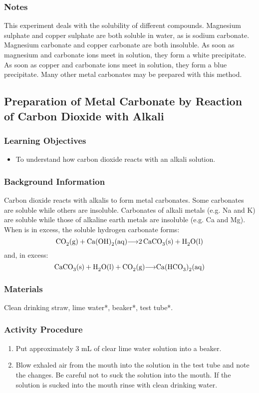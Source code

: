 \subsubsection*{Notes}
This experiment deals with the solubility of different compounds. Magnesium sulphate and copper sulphate are both soluble in water, as is sodium carbonate. Magnesium carbonate and copper carbonate are both insoluble. As soon as magnesium and carbonate ions meet in solution, they form a white precipitate. As soon as copper and carbonate ions meet in solution, they form a blue precipitate. Many other metal carbonates may be prepared with this method.

\subsection{Preparation of Metal Carbonate by Reaction of Carbon Dioxide with Alkali}

\subsubsection*{Learning Objectives}
\begin{itemize}
\item{To understand how carbon dioxide reacts with an alkali solution.}
\end{itemize}

\subsubsection*{Background Information}
Carbon dioxide reacts with alkalis to form metal carbonates. Some carbonates are soluble while others are insoluble. Carbonates of alkali metals (e.g. Na and K) are soluble while those of alkaline earth metals are insoluble (e.g. Ca and Mg). When  is in excess, the soluble hydrogen carbonate forms:
$$\ce{CO2 (g) + Ca(OH)2 (aq)$\longrightarrow$ 2CaCO3 (s) + H2O (l)}$$
and, in excess: $$\ce{CaCO3(s) + H2O(l) +  CO2(g) $\longrightarrow$ Ca(HCO3)2(aq)}$$

\subsubsection*{Materials}
Clean drinking straw, lime water*, beaker*, test tube*.

\subsubsection*{Activity Procedure}
\begin{enumerate}
\item{Put approximately 3 mL of clear lime water solution into a beaker.}
\item{Blow exhaled air from the mouth into the solution in the test tube and note the changes. Be careful not to suck the solution into the mouth. If the solution is sucked into the mouth rinse with clean drinking water.}
\end{enumerate}

